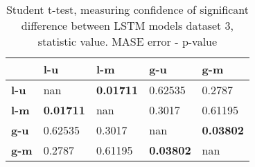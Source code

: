 \begin{table}[h]
\centering
\caption{Student t-test, measuring confidence of significant difference between LSTM models dataset 3, statistic value. MASE error - p-value}
\label{table:ttest-p-values-lstm-experiments-MASE-dataset-3}
\begin{tabular}{lllll}
\toprule
{} &               l-u &               l-m &               g-u &               g-m \\
\midrule
\textbf{l-u} &               nan &  \textbf{0.01711} &           0.62535 &            0.2787 \\
\textbf{l-m} &  \textbf{0.01711} &               nan &            0.3017 &           0.61195 \\
\textbf{g-u} &           0.62535 &            0.3017 &               nan &  \textbf{0.03802} \\
\textbf{g-m} &            0.2787 &           0.61195 &  \textbf{0.03802} &               nan \\
\bottomrule
\end{tabular}
\end{table}
